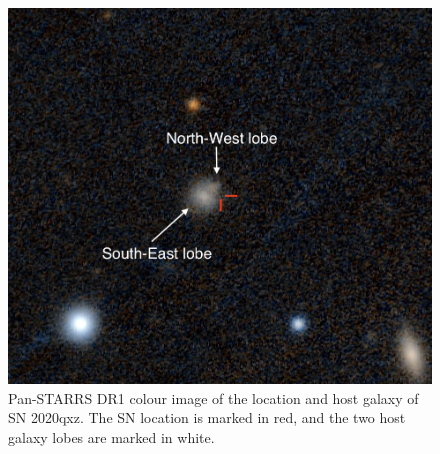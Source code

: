 \documentclass[a4paper,oneside,12pt, class=Latex/Classes/PhDthesisPSnPDF, crop=false]{standalone}
\begin{document}
\label{sec:SN2020qxz}
\begin{figure}
    \centering
    \includegraphics[width=\textwidth]{../Images/chapter_5/2020qxz_loc.png}
    \caption{Pan-STARRS DR1 colour image of the location and host galaxy of SN 2020qxz. The SN location is marked in red, and the two host galaxy lobes are marked in white.}
    \label{2020qxz_loc}
\end{figure}
\end{document}
